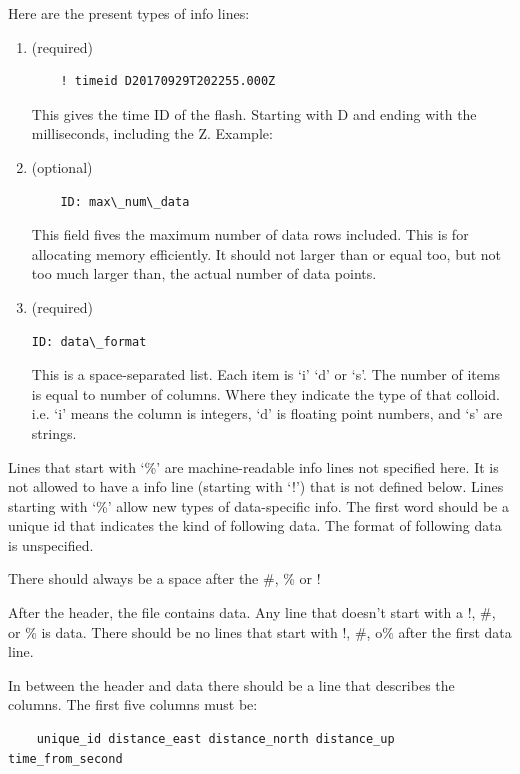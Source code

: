 \documentclass[a4paper,10pt,bibtotoc]{scrartcl}
\begin{document}
Here are the present types of info lines: 
\begin{enumerate}

\item  (required)

\begin{verbatim}
    ! timeid D20170929T202255.000Z
\end{verbatim}

This gives the time ID of the flash. Starting with D and ending with the milliseconds, including the Z. 
Example:


\item (optional)
\begin{verbatim}
    ID: max\_num\_data
\end{verbatim}

This field fives the maximum number of data rows included. This is for allocating memory efficiently. It should not larger than or equal too, but not too much larger than, the actual number of data points.

\item (required)
\begin{verbatim}
ID: data\_format

\end{verbatim}
This is a space-separated list. Each item is ‘i’ ‘d’ or ‘s’. The number of items is equal to number of columns. Where they indicate the type of that colloid. i.e. ‘i’ means the column is integers, ‘d’ is floating point numbers, and ‘s’ are strings. 
\end{enumerate}

Lines that start with ‘\%’ are machine-readable info lines not specified here. It is not allowed to have a info line (starting with ‘!’) that is not defined below. Lines starting with ‘\%’ allow new types of data-specific info. The first word should be a unique id that indicates the kind of following data. The format of following data is unspecified.

There should always be a space after the \#, \% or !

After the header, the file contains data. Any line that doesn’t start with a !, \#, or \% is data. There should be no lines that start with !, \#, o\%  after the first data line.

In between the header and data there should be a line that describes the columns. The first five columns must be:
\begin{verbatim}
    unique_id distance_east distance_north distance_up time_from_second 
\end{verbatim}
\end{document}
